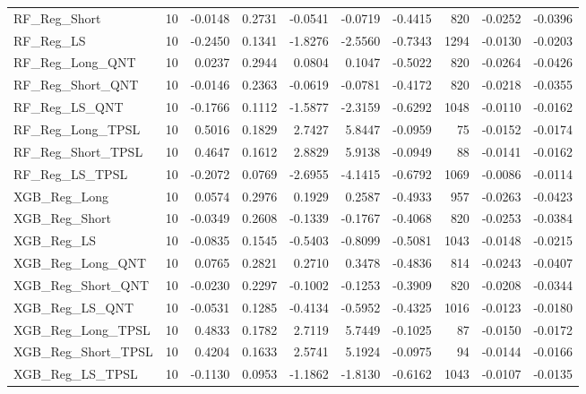 \begin{tabular}{llrrrrrrrr}
\cline{1-10}
RF\_Reg\_Short & 10 & -0.0148 & 0.2731 & -0.0541 & -0.0719 & -0.4415 & 820 & -0.0252 & -0.0396 \\
\cline{1-10}
RF\_Reg\_LS & 10 & -0.2450 & 0.1341 & -1.8276 & -2.5560 & -0.7343 & 1294 & -0.0130 & -0.0203 \\
\cline{1-10}
RF\_Reg\_Long\_QNT & 10 & 0.0237 & 0.2944 & 0.0804 & 0.1047 & -0.5022 & 820 & -0.0264 & -0.0426 \\
\cline{1-10}
RF\_Reg\_Short\_QNT & 10 & -0.0146 & 0.2363 & -0.0619 & -0.0781 & -0.4172 & 820 & -0.0218 & -0.0355 \\
\cline{1-10}
RF\_Reg\_LS\_QNT & 10 & -0.1766 & 0.1112 & -1.5877 & -2.3159 & -0.6292 & 1048 & -0.0110 & -0.0162 \\
\cline{1-10}
RF\_Reg\_Long\_TPSL & 10 & 0.5016 & 0.1829 & 2.7427 & 5.8447 & -0.0959 & 75 & -0.0152 & -0.0174 \\
\cline{1-10}
RF\_Reg\_Short\_TPSL & 10 & 0.4647 & 0.1612 & 2.8829 & 5.9138 & -0.0949 & 88 & -0.0141 & -0.0162 \\
\cline{1-10}
RF\_Reg\_LS\_TPSL & 10 & -0.2072 & 0.0769 & -2.6955 & -4.1415 & -0.6792 & 1069 & -0.0086 & -0.0114 \\
\cline{1-10}
XGB\_Reg\_Long & 10 & 0.0574 & 0.2976 & 0.1929 & 0.2587 & -0.4933 & 957 & -0.0263 & -0.0423 \\
\cline{1-10}
XGB\_Reg\_Short & 10 & -0.0349 & 0.2608 & -0.1339 & -0.1767 & -0.4068 & 820 & -0.0253 & -0.0384 \\
\cline{1-10}
XGB\_Reg\_LS & 10 & -0.0835 & 0.1545 & -0.5403 & -0.8099 & -0.5081 & 1043 & -0.0148 & -0.0215 \\
\cline{1-10}
XGB\_Reg\_Long\_QNT & 10 & 0.0765 & 0.2821 & 0.2710 & 0.3478 & -0.4836 & 814 & -0.0243 & -0.0407 \\
\cline{1-10}
XGB\_Reg\_Short\_QNT & 10 & -0.0230 & 0.2297 & -0.1002 & -0.1253 & -0.3909 & 820 & -0.0208 & -0.0344 \\
\cline{1-10}
XGB\_Reg\_LS\_QNT & 10 & -0.0531 & 0.1285 & -0.4134 & -0.5952 & -0.4325 & 1016 & -0.0123 & -0.0180 \\
\cline{1-10}
XGB\_Reg\_Long\_TPSL & 10 & 0.4833 & 0.1782 & 2.7119 & 5.7449 & -0.1025 & 87 & -0.0150 & -0.0172 \\
\cline{1-10}
XGB\_Reg\_Short\_TPSL & 10 & 0.4204 & 0.1633 & 2.5741 & 5.1924 & -0.0975 & 94 & -0.0144 & -0.0166 \\
\cline{1-10}
XGB\_Reg\_LS\_TPSL & 10 & -0.1130 & 0.0953 & -1.1862 & -1.8130 & -0.6162 & 1043 & -0.0107 & -0.0135 \\

\end{tabular}

